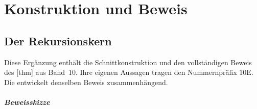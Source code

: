 \chapter{Konstruktion und Beweis}
\section{Der Rekursionskern}

Diese Ergänzung enthält die Schnittkonstruktion und den vollständigen
Beweis des [thm] aus Band~10.
Ihre eigenen Aussagen tragen den Nummernpräfix \(10\mathrm E\).
Die \DedekindReadingLink{} entwickelt denselben Beweis zusammenhängend.


\paragraph{Beweisskizze}

